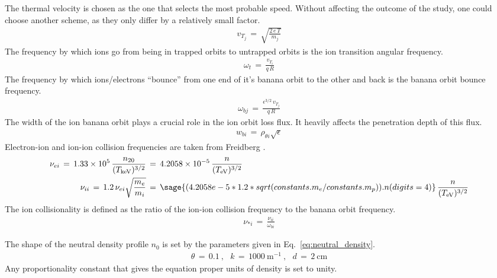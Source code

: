The thermal velocity is chosen as the one that selects the most probable speed.
Without affecting the outcome of the study, one could choose another scheme, as they only differ by a relatively small factor.
\begin{align} %
	v_{T_j} \,=\, \sqrt{\frac{2 \, e \, T}{m_j}}
		\label{eq:thermal_velocity}
\end{align}
The frequency by which ions go from being in trapped orbits to untrapped orbits is the ion transition angular frequency.
\begin{align} %
	\omega_t \,=\, \frac{v_{T_i}}{q \, R} \label{eq:transition_freq}
\end{align}
The frequency by which ions/electrons ``bounce'' from one end of it's banana orbit to the other and back is the banana orbit bounce frequency.
\begin{align} %
	\omega_{bj} \,=\, \frac{\epsilon^{3/2} \, v_{T_j}}{q \, R}
		\label{eq:banana_bounce_freq}
\end{align}
The width of the ion banana orbit plays a crucial role in the ion orbit loss flux.
It heavily affects the penetration depth of this flux.
\begin{align} %
	w_{bi} \,=\, \rho_{\theta i} \sqrt{\epsilon} \label{eq:banana_width}
\end{align}
Electron-ion and ion-ion collision frequencies are taken from Freidberg \cite{freidberg_plasma_2007}.
\begin{align} %
	\nu_{ei} \,=\, 1.33\times 10^5 \, \frac{n_{20}}{(T_\text{keV})^{3/2}}
		\,&=\, 4.2058\times 10^{-5} \, \frac{n}{(T_\text{eV})^{3/2}}
		\label{eq:nu_ei} \\
	\nu_{ii} \,=\, 1.2 \, \nu_{ei} \sqrt{\frac{m_e}{m_i}} \,&=\,
		\sage{(4.2058e-5* 1.2 * sqrt(constants.m_e / constants.m_p)).n(digits=4)}
		\, \frac{n}{(T_\text{eV})^{3/2}} \label{eq:nu_ii}
\end{align}
The ion collisionality is defined as the ratio of the ion-ion collision frequency to the banana orbit frequency.
\begin{align} %
	\nu_{*i} \,=\, \frac{\nu_{ii}}{\omega_{bi}} \label{eq:collisionality}
\end{align}

The shape of the neutral density profile $n_0$ is set by the parameters given in Eq.~\ref{eq:neutral_density}.
\begin{align}
	\theta \,=\, 0.1~,~~~ k \,=\, 1000~\text{m}^{-1}~,~~~ d \,=\, 2~\text{cm}
\end{align}
Any proportionality constant that gives the equation proper units of density is set to unity.

